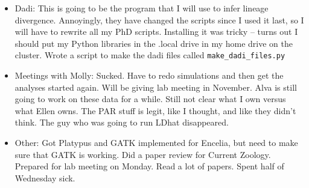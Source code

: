 \documentclass[idxtotoc,hyperref,openany,oneside]{labbook} %
\begin{document}
\begin{itemize}
\item Dadi: This is going to be the program that I will use to infer lineage divergence. Annoyingly, they have changed the scripts since I used it last, so I will have to rewrite all my PhD scripts. Installing it was tricky -- turns out I should put my Python libraries in the .local drive in my home drive on the cluster. Wrote a script to make the dadi files called \verb+make_dadi_files.py+
\item Meetings with Molly: Sucked. Have to redo simulations and then get the analyses started again. Will be giving lab meeting in November. Alva is still going to work on these data for a while. Still not clear what I own versus what Ellen owns. The PAR stuff is legit, like I thought, and like they didn't think. The guy who was going to run LDhat disappeared.
\item Other: Got Platypus and GATK implemented for Encelia, but need to make sure that GATK is working. Did a paper review for Current Zoology. Prepared for lab meeting on Monday. Read a lot of papers. Spent half of Wednesday sick.
\end{itemize}
\end{document}

